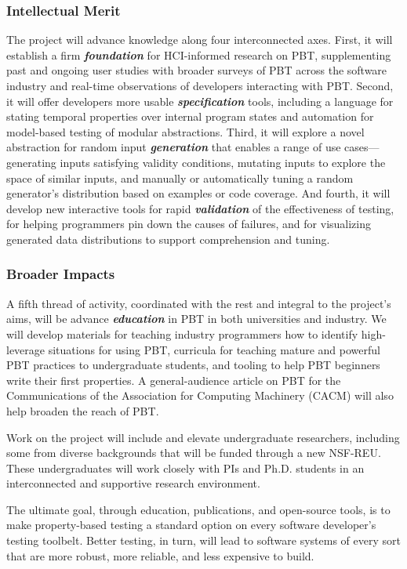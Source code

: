 \subsubsection*{Intellectual Merit}
The project will advance knowledge along four interconnected axes.
%
First, it will establish a firm {\bf\em foundation} for HCI-informed
research on PBT, supplementing past and ongoing user studies with
broader surveys of PBT across the software industry and real-time
observations of developers interacting with PBT.
%
Second, it will offer developers more usable {\bf\em specification} tools,
including a language for stating temporal properties over internal
program states and automation for model-based testing of
modular abstractions.
%
Third, it will explore a novel abstraction for random input {\bf\em
  generation} that enables a range of use cases---generating inputs
satisfying validity conditions, mutating inputs to explore the space
of similar inputs, and manually or automatically tuning a random
generator's distribution based on examples or code coverage.
%
And fourth, it will develop new interactive tools for rapid {\bf\em
  validation} of the effectiveness of testing, for helping programmers pin
down the causes of failures, and for visualizing generated data
distributions to support comprehension and tuning.


\subsubsection*{Broader Impacts}
A fifth thread of activity, coordinated with the rest and integral to the
project's aims, will be advance {\bf\em education} in PBT in both universities and industry. We will
develop materials for teaching industry programmers how to identify
high-leverage situations for using PBT, curricula for teaching mature
and powerful PBT practices to undergraduate students, and tooling to help
PBT beginners write their first properties.
%
A general-audience article on PBT for the Communications of the
Association for Computing Machinery (CACM) will also help broaden the
reach of PBT.

Work on the project will include and elevate undergraduate
researchers, including some from diverse backgrounds that will be
funded through a new NSF-REU. These undergraduates will work
closely with PIs and Ph.D.{} students in an interconnected and supportive
research environment.

The ultimate goal, through education, publications, and open-source
tools, is to make property-based testing a standard option on every
software developer's testing toolbelt.  Better testing, in turn, will
lead to software systems of every sort that are more robust, more
reliable, and less expensive to build.


